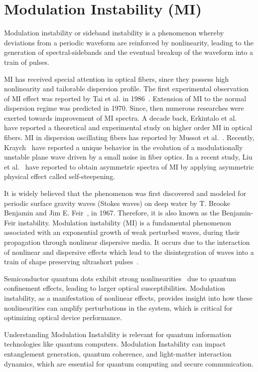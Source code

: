 \documentclass[12pt,a4paper]{article}
\begin{document}
\section{Modulation Instability (MI)}
Modulation instability or sideband instability is a phenomenon whereby deviations from a periodic waveform are reinforced by nonlinearity, leading to the generation of spectral-sidebands and the eventual breakup of the waveform into a train of pulses.\par
MI has received special attention in optical fibers, since they possess high nonlinearity and tailorable dispersion profile. The first experimental observation of MI effect was reported by Tai et al. in 1986~\cite{tai1986generation}. Extension of MI to the normal dispersion regime was predicted in 1970. Since, then numerous researches were exerted towards improvement of MI spectra. A decade back, Erkintalo et al.~\cite{erkintalo2011higher} have reported a theoretical and experimental study on higher order MI in optical fibers. MI in dispersion oscillating fibers has reported by Mussot et al.~\cite{mussot2017modulation}. Recently, Kraych~\cite{kraych2019nonlinear} have reported a unique behavior in the evolution of a modulationally unstable plane wave driven by a small noise in fiber optics. In a recent study, Liu et al.~\cite{liu2021exact} have reported to obtain asymmetric spectra of MI by applying asymmetric physical effect called self-steepening.\par
It is widely believed that the phenomenon was first discovered and modeled for periodic surface gravity waves (Stokes waves) on deep water by T. Brooke Benjamin and Jim E. Feir~\cite{Benjamin_Feir_1967}, in 1967. Therefore, it is also known as the Benjamin-Feir instability. Modulation instability (MI) is a fundamental phenomenon associated with an exponential growth of weak perturbed waves, during their propagation through nonlinear dispersive media. It occurs due to the interaction of nonlinear and dispersive effects which lead to the disintegration of waves into a train of shape preserving ultrashort pulses~\cite{MANUKURE2021100140}.\par
Semiconductor quantum dots exhibit strong nonlinearities~\cite{Scully_Zubairy_1997} due to quantum confinement effects, leading to larger optical susceptibilities. Modulation instability, as a manifestation of nonlinear effects, provides insight into how these nonlinearities can amplify perturbations in the system, which is critical for optimizing optical device performance.\par
Understanding Modulation Instability is relevant for quantum information technologies like quantum computers. Modulation Instability can impact entanglement generation, quantum coherence, and light-matter interaction dynamics, which are essential for quantum computing and secure communication.
\end{document}
